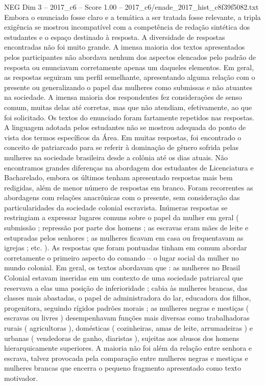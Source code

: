 \begin{textsample}{NEG Dim 3 – 2017\_c6 – Score 1.00 – 2017\_c6/enade\_2017\_hist\_c8f39f5082.txt}
Embora o enunciado fosse claro e a temática a ser tratada fosse relevante, a tripla exigência se mostrou incompatível com a competência de redação sintética dos estudantes e o espaço destinado à resposta.
A diversidade de respostas encontradas não foi muito grande.
A imensa maioria dos textos apresentados pelos participantes não abordava nenhum dos aspectos elencados pelo padrão de resposta ou enunciavam corretamente apenas um daqueles elementos.
Em geral, as respostas seguiram um perfil semelhante, apresentando alguma relação com o presente ou generalizando o papel das mulheres como submissas e não atuantes na sociedade.
A imensa maioria dos respondentes fez considerações de senso comum, muitas delas até corretas, mas que não atendiam, efetivamente, ao que foi solicitado.
Os textos do enunciado foram fartamente repetidos nas respostas.
A linguagem adotada pelos estudantes não se mostrou adequada do ponto de vista dos termos específicos da Área.
Em muitas respostas, foi encontrado o conceito de patriarcado para se referir à dominação de gênero sofrida pelas mulheres na sociedade brasileira desde a colônia até os dias atuais.
Não encontramos grandes diferenças na abordagem dos estudantes de Licenciatura e Bacharelado, embora os últimos tenham apresentado respostas mais bem redigidas, além de menor número de respostas em branco.
Foram recorrentes as abordagens com relações anacrônicas com o presente, sem consideração das particularidades da sociedade colonial escravista.
Inúmeras respostas se restringiam a expressar lugares comuns sobre o papel da mulher em geral ( submissão ; repressão por parte dos homens ; as escravas eram mães de leite e estupradas pelos senhores ; as mulheres ficavam em casa ou frequentavam as igrejas ; etc. ).
As respostas que foram pontuadas tinham em comum abordar corretamente o primeiro aspecto do comando – o lugar social da mulher no mundo colonial.
Em geral, os textos abordavam que : as mulheres no Brasil Colonial estavam inseridas em um contexto de uma sociedade patriarcal que reservava a elas uma posição de inferioridade ; cabia às mulheres brancas, das classes mais abastadas, o papel de administradora do lar, educadora dos filhos, progenitora, seguindo rígidos padrões morais ; as mulheres negras e mestiças ( escravas ou livres ) desempenhavam funções mais diversas como trabalhadoras rurais ( agricultoras ), domésticas ( cozinheiras, amas de leite, arrumadeiras ) e urbanas ( vendedoras de ganho, diaristas ), sujeitas aos abusos dos homens hierarquicamente superiores.
A maioria não foi além da relação entre senhora e escrava, talvez provocada pela comparação entre mulheres negras e mestiças e mulheres brancas que encerra o pequeno fragmento apresentado como texto motivador.

\end{textsample}
